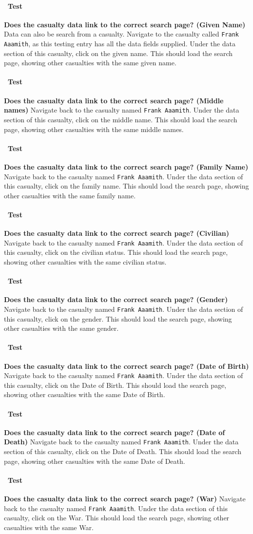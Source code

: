 \documentclass[12pt]{article}
\newcounter{Test}
\newcommand{\test}[1]{%
\stepcounter{Test}%
\paragraph{\Circle\ Test \theTest} \textbf{#1} }
\begin{document}
\test{Does the casualty data link to the correct search page? (Given Name)}
Data can also be search from a casualty. Navigate to the casualty called \texttt{Frank Aaamith}, as this testing entry has all the data fields supplied. Under the data section of this casualty, click on the given name. This should load the search page, showing other casualties with the same given name.

\test{Does the casualty data link to the correct search page? (Middle names)}
Navigate back to the casualty named \texttt{Frank Aaamith}. Under the data section of this casualty, click on the middle name. This should load the search page, showing other casualties with the same middle names.

\test{Does the casualty data link to the correct search page? (Family Name)}
Navigate back to the casualty named \texttt{Frank Aaamith}. Under the data section of this casualty, click on the family name. This should load the search page, showing other casualties with the same family name.

\test{Does the casualty data link to the correct search page? (Civilian)}
Navigate back to the casualty named \texttt{Frank Aaamith}. Under the data section of this casualty, click on the civilian status. This should load the search page, showing other casualties with the same civilian status.

\test{Does the casualty data link to the correct search page? (Gender)}
Navigate back to the casualty named \texttt{Frank Aaamith}. Under the data section of this casualty, click on the gender. This should load the search page, showing other casualties with the same gender.

\test{Does the casualty data link to the correct search page? (Date of Birth)}
Navigate back to the casualty named \texttt{Frank Aaamith}. Under the data section of this casualty, click on the Date of Birth. This should load the search page, showing other casualties with the same Date of Birth.

\test{Does the casualty data link to the correct search page? (Date of Death)}
Navigate back to the casualty named \texttt{Frank Aaamith}. Under the data section of this casualty, click on the Date of Death. This should load the search page, showing other casualties with the same Date of Death.

\test{Does the casualty data link to the correct search page? (War)}
Navigate back to the casualty named \texttt{Frank Aaamith}. Under the data section of this casualty, click on the War. This should load the search page, showing other casualties with the same War.
\end{document}
